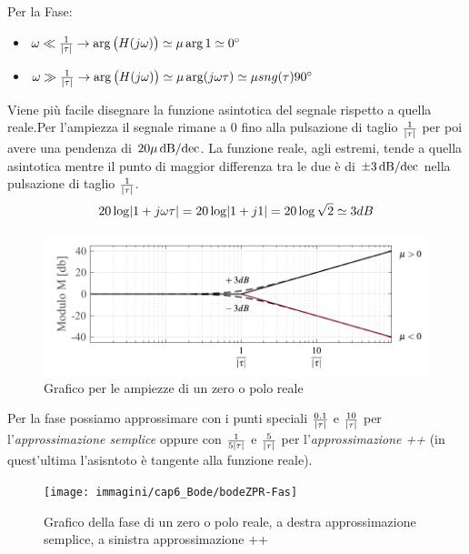 Per la Fase:
\begin{itemize}
	\item $ \omega \ll \frac{1}{\abs{\tau}} \rightarrow \arg \big(H(j\omega)\big) \simeq \mu \arg 1 \simeq \ang{0} $ 
	\item $ \omega \gg \frac{1}{\abs{\tau}} \rightarrow \arg \big(H(j\omega)\big) \simeq \mu \arg (j\omega\tau) \simeq \mu \sng(\tau)\ang{90} $ 
\end{itemize}

Viene più facile disegnare la funzione asintotica del segnale rispetto a quella reale.Per l'ampiezza il segnale rimane a $ 0 $ fino alla pulsazione di taglio $ \frac{1}{\abs{\tau}} $ per poi avere una pendenza di $ 20 \mu \dbdec $. La funzione reale, agli estremi, tende a quella asintotica mentre il punto di maggior differenza tra le due è di $ \pm 3 \dbdec $ nella pulsazione di taglio $ \frac{1}{\abs{\tau}} $.
\[ 20\log \abs{1+j\omega\tau} = 20\log \abs{1+j1} = 20\log \sqrt{2} \simeq 3 dB \] 

\begin{figure}[H]
	\centering
	\includegraphics[width=0.7\linewidth]{immagini/cap6_Bode/bodeZPR-Amp}
	\caption{Grafico per le ampiezze di un zero o polo reale}
	\label{fig:bodezpr-amp}
\end{figure}

Per la fase possiamo approssimare con i punti speciali $ \frac{0.1}{\abs{\tau}} $ e $ \frac{10}{\abs{\tau}} $ per l'\emph{approssimazione semplice} oppure con $ \frac{1}{5\abs{\tau}} $ e $ \frac{5}{\abs{\tau}} $ per l'\emph{approssimazione ++} (in quest'ultima l'asisntoto è tangente alla funzione reale).

\begin{figure}[H]
	\centering
	\texttt{[image: immagini/cap6\_Bode/bodeZPR-Fas]}
	\caption{Grafico della fase di un zero o polo reale, a destra approssimazione semplice, a sinistra approssimazione ++}
	\label{fig:bodezpr-fas}
\end{figure}

